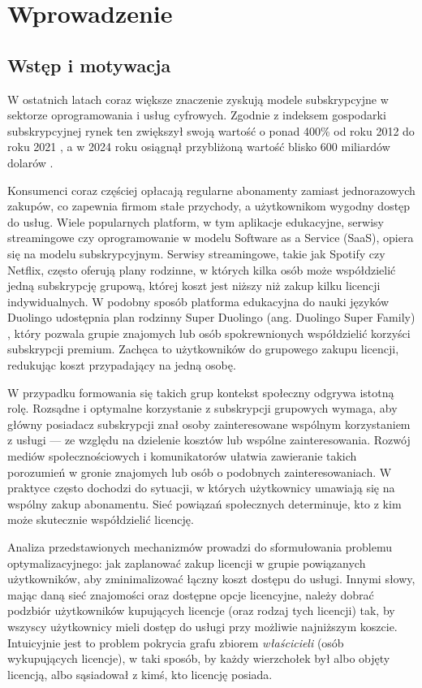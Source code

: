 \chapter{Wprowadzenie}

\section{Wstęp i motywacja}
W ostatnich latach coraz większe znaczenie zyskują modele subskrypcyjne w sektorze oprogramowania i usług cyfrowych. Zgodnie z indeksem gospodarki subskrypcyjnej rynek ten zwiększył swoją wartość o ponad 400\% od roku 2012 do roku 2021 \cite{subscriptionEconomyIndex}, a w 2024 roku osiągnął przybliżoną wartość blisko 600 miliardów dolarów \cite{subscriptionEconomyPrice2024}.

Konsumenci coraz częściej opłacają regularne abonamenty zamiast jednorazowych zakupów, co zapewnia firmom stałe przychody, a użytkownikom wygodny dostęp do usług. Wiele popularnych platform, w tym aplikacje edukacyjne, serwisy streamingowe czy oprogramowanie w modelu Software as a Service (SaaS), opiera się na modelu subskrypcyjnym. Serwisy streamingowe, takie jak Spotify czy Netflix, często oferują plany rodzinne, w których kilka osób może współdzielić jedną subskrypcję grupową, której koszt jest niższy niż zakup kilku licencji indywidualnych. W podobny sposób platforma edukacyjna do nauki języków Duolingo udostępnia plan rodzinny Super Duolingo (ang. Duolingo Super Family) \cite{duolingo_family_blog}, który pozwala grupie znajomych lub osób spokrewnionych współdzielić korzyści subskrypcji premium. Zachęca to użytkowników do grupowego zakupu licencji, redukując koszt przypadający na jedną osobę.

W przypadku formowania się takich grup kontekst społeczny odgrywa istotną rolę. Rozsądne i optymalne korzystanie z subskrypcji grupowych wymaga, aby główny posiadacz subskrypcji znał osoby zainteresowane wspólnym korzystaniem z usługi --- ze względu na dzielenie kosztów lub wspólne zainteresowania. Rozwój mediów społecznościowych i komunikatorów ułatwia zawieranie takich porozumień w gronie znajomych lub osób o podobnych zainteresowaniach. W praktyce często dochodzi do sytuacji, w których użytkownicy umawiają się na wspólny zakup abonamentu. Sieć powiązań społecznych determinuje, kto z kim może skutecznie współdzielić licencję.

Analiza przedstawionych mechanizmów prowadzi do sformułowania problemu optymalizacyjnego: jak zaplanować zakup licencji w grupie powiązanych użytkowników, aby zminimalizować łączny koszt dostępu do usługi. Innymi słowy, mając daną sieć znajomości oraz dostępne opcje licencyjne, należy dobrać podzbiór użytkowników kupujących licencje (oraz rodzaj tych licencji) tak, by wszyscy użytkownicy mieli dostęp do usługi przy możliwie najniższym koszcie. Intuicyjnie jest to problem pokrycia grafu zbiorem \emph{właścicieli} (osób wykupujących licencje), w taki sposób, by każdy wierzchołek był albo objęty licencją, albo sąsiadował z kimś, kto licencję posiada.

